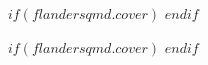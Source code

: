 $if(flandersqmd.cover)$
\begingroup
\let\cleardoubleoddpage\clearpage
\thispagestyle{empty}{}
$endif$
\frontmatter
\maketitle
$if(flandersqmd.cover)$
\endgroup
$endif$
